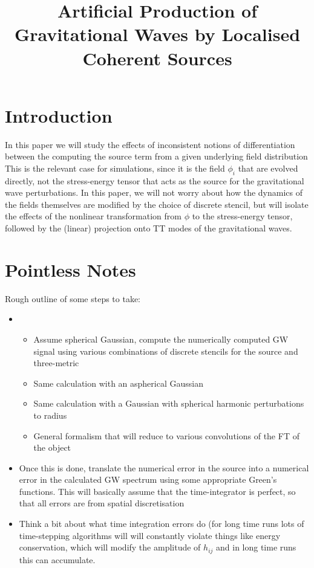 \documentclass{revtex4}
\title{Artificial Production of Gravitational Waves by Localised Coherent Sources}
\begin{document}
\maketitle

\section{Introduction}
In this paper we will study the effects of inconsistent notions of differentiation between the computing the source term from a given underlying field distribution
This is the relevant case for simulations, since it is the field $\phi_i$ that are evolved directly, not the stress-energy tensor that acts as the source for the gravitational wave perturbations.
In this paper, we will not worry about how the dynamics of the fields themselves are modified by the choice of discrete stencil, but will isolate the effects of the nonlinear transformation from $\phi$ to the stress-energy tensor, followed by the (linear) projection onto TT modes of the gravitational waves.


\section{Pointless Notes}
Rough outline of some steps to take:
\begin{itemize}
\item
  \begin{itemize}
  \item Assume spherical Gaussian, compute the numerically computed GW signal using various combinations of discrete stencils for the source and three-metric
  \item Same calculation with an aspherical Gaussian
  \item Same calculation with a Gaussian with spherical harmonic perturbations to radius
  \item General formalism that will reduce to various convolutions of the FT of the object
  \end{itemize}
\item Once this is done, translate the numerical error in the source into a numerical error in the calculated GW spectrum using some appropriate Green's functions.  This will basically assume that the time-integrator is perfect, so that all errors are from spatial discretisation
\item Think a bit about what time integration errors do (for long time runs lots of time-stepping algorithms will will constantly violate things like energy conservation, which will modify the amplitude of $h_{ij}$ and in long time runs this can accumulate.
\end{itemize}
\end{document}
